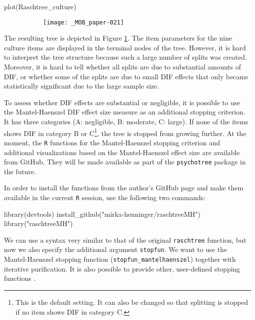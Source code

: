 \documentclass[doc,floatsintext,natbib]{apa7}
\begin{document}
\begin{Schunk}
\begin{Sinput}
 plot(Raschtree_culture)
\end{Sinput}
\end{Schunk}

\begin{figure}%
\caption{Rasch tree fitted to the SPISA quiz items using the default stopping criterion based on statistical significance.}
\begin{subfigure}{1.2\textwidth}
\texttt{[image: \_MOB\_paper-021]}
\end{subfigure}
\label{fig:MHtree1}
\end{figure}%

The resulting tree is depicted in Figure \ref{fig:MHtree1}. The item parameters for the nine culture items are displayed in the terminal nodes of the tree. However, it is hard to interpret the tree structure because such a large number of splits was created. Moreover, it is hard to tell whether all splits are due to substantial amounts of DIF, or whether some of the splits are due to small DIF effects that only became statistically significant due to the large sample size.

To assess whether DIF effects are substantial or negligible, it is possible to use the Mantel-Haenszel DIF effect size measure as an additional stopping criterion. It has three categories (A: negligible, B: moderate, C: large). If none of the items shows DIF in category B or C\footnote{This is the default setting. It can also be changed so that splitting is stopped if no item shows DIF in category C.}, the tree is stopped from growing further.
At the moment, the \texttt{R} functions for the Mantel-Haenszel stopping criterion and additional visualizations based on the Mantel-Haenszel effect size are available from GitHub. They will be made available as part of the \texttt{psychotree} package in the future.

In order to install the functions from the author's GitHub page and make them available in the current \texttt{R} session, use the following two commands:

\begin{Schunk}
\begin{Sinput}
 library(devtools)
 install_github("mirka-henninger/raschtreeMH")
 library("raschtreeMH")
\end{Sinput}
\end{Schunk}

We can use a syntax very similar to that of the original \texttt{raschtree} function, but now we also specify the additional argument \texttt{stopfun}. We want to use the Mantel-Haenszel stopping function (\texttt{stopfun\_mantelhaenszel}) together with iterative purification. It is also possible to provide other, user-defined stopping functions \citep[see][for details]{HennyDeba23}.
\end{document}
